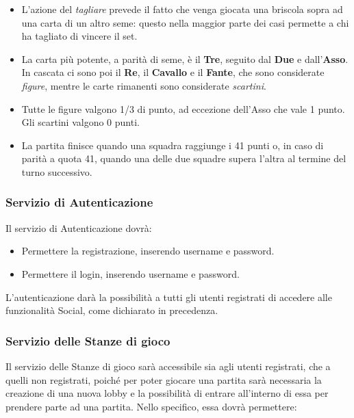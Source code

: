 \begin {itemize}
            \item L'azione del \textit{tagliare} prevede il fatto che venga giocata una briscola sopra ad una carta di un altro seme: questo nella maggior parte dei casi permette a chi ha tagliato di vincere il set.
            \item La carta più potente, a parità di seme, è il \textbf{Tre}, seguito dal \textbf{Due} e dall'\textbf{Asso}. In cascata ci sono poi il \textbf{Re}, il \textbf{Cavallo} e il \textbf{Fante}, che sono considerate \textit{figure}, mentre le carte rimanenti sono considerate \textit {scartini}.
            \item Tutte le figure valgono 1/3 di punto, ad eccezione dell'Asso che vale 1 punto. Gli scartini valgono 0 punti.
            \item La partita finisce quando una squadra raggiunge i 41 punti o, in caso di parità a quota 41, quando una delle due squadre supera l'altra al termine del turno successivo.
            \end {itemize}

            \subsubsection[Autenticazione]{\large {Servizio di Autenticazione}\label{subsub:requirements:auth}}
            Il servizio di Autenticazione dovrà:

            \begin {itemize}
            \item Permettere la registrazione, inserendo username e password.
            \item Permettere il login, inserendo username e password.
            \end {itemize}

            L'autenticazione darà la possibilità a tutti gli utenti registrati di accedere alle funzionalità Social, come dichiarato in precedenza.

            \subsubsection[Stanze di Gioco]{\large {Servizio delle Stanze di gioco}\label{subsub:requirements:lobby}}
            Il servizio delle Stanze di gioco sarà accessibile sia agli utenti registrati, che a quelli non registrati, poiché per poter giocare una partita sarà necessaria la creazione di una nuova lobby e la possibilità di entrare all'interno di essa per prendere parte ad una partita. Nello specifico, essa dovrà permettere:

